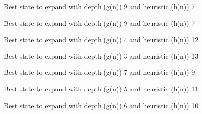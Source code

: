 \documentclass{article}
\begin{document}
{\noindent Best state to expand with depth (g(n)) 9 and heuristic (h(n)) 7\newline}
{}\newline

{\noindent Best state to expand with depth (g(n)) 9 and heuristic (h(n)) 7\newline}
{}\newline

{\noindent Best state to expand with depth (g(n)) 4 and heuristic (h(n)) 12\newline}
{}\newline

{\noindent Best state to expand with depth (g(n)) 3 and heuristic (h(n)) 13\newline}
{}\newline

{\noindent Best state to expand with depth (g(n)) 7 and heuristic (h(n)) 9\newline}
{}\newline

{\noindent Best state to expand with depth (g(n)) 5 and heuristic (h(n)) 11\newline}
{}\newline

{\noindent Best state to expand with depth (g(n)) 6 and heuristic (h(n)) 10\newline}
{}\newline
\end{document}
